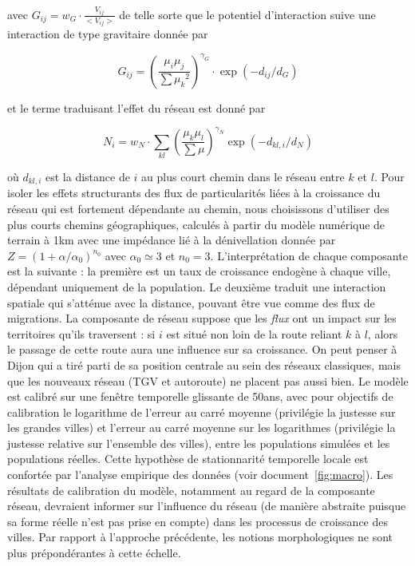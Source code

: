avec $G_{ij} = w_G\cdot \frac{V_{ij}}{<V_{ij}>}$ de telle sorte que le potentiel d'interaction suive une interaction de type gravitaire donnée par

\begin{equation}
G_{ij} = \left(\frac{\mu_i\mu_j}{\sum{\mu_k}^2}\right)^{\gamma_G}\cdot \exp{(-d_{ij}/d_G)}
\end{equation}

et le terme traduisant l'effet du réseau est donné par


\begin{equation}
N_{i} = w_N \cdot \sum_{kl} \left(\frac{\mu_k\mu_l}{\sum\mu}\right)^{\gamma_N}\exp{(-d_{kl,i}/d_N)}
\end{equation}

où $d_{kl,i}$ est la distance de $i$ au plus court chemin dans le réseau entre $k$ et $l$. Pour isoler les effets structurants des flux de particularités liées à la croissance du réseau qui est fortement dépendante au chemin, nous choisissons d'utiliser des plus courts chemins géographiques, calculés à partir du modèle numérique de terrain à 1km avec une impédance lié à la dénivellation donnée par $Z=\left(1+\alpha/\alpha_0\right)^{n_0}$ avec $\alpha_0\simeq 3$ et $n_0 = 3$. L'interprétation de chaque composante est la suivante : la première est un taux de croissance endogène à chaque ville, dépendant uniquement de la population. Le deuxième traduit une interaction spatiale qui s'atténue avec la distance, pouvant être vue comme des flux de migrations. La composante de réseau suppose que les \emph{flux} ont un impact sur les territoires qu'ils traversent : si $i$ est situé non loin de la route reliant $k$ à $l$, alors le passage de cette route aura une influence sur sa croissance. On peut penser à Dijon qui a tiré parti de sa position centrale au sein des réseaux classiques, mais que les nouveaux réseau (TGV et autoroute) ne placent pas aussi bien. Le modèle est calibré sur une fenêtre temporelle glissante de 50ans, avec pour objectifs de calibration le logarithme de l'erreur au carré moyenne (privilégie la justesse sur les grandes villes) et l'erreur au carré moyenne sur les logarithmes (privilégie la justesse relative sur l'ensemble des villes), entre les populations simulées et les populations réelles. Cette hypothèse de stationnarité temporelle locale est confortée par l'analyse empirique des données (voir document~\ref{fig:macro}). Les résultats de calibration du modèle, notamment au regard de la composante réseau, devraient informer sur l'influence du réseau (de manière abstraite puisque sa forme réelle n'est pas prise en compte) dans les processus de croissance des villes. Par rapport à l'approche précédente, les notions morphologiques ne sont plus prépondérantes à cette échelle.

